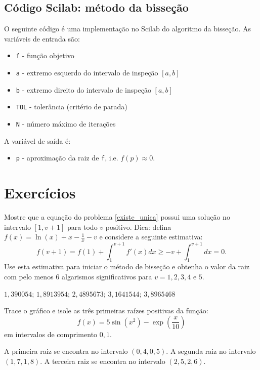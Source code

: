 \documentclass[main.tex]{subfiles}
\begin{document}
\ifisscilab
\subsection{Código Scilab: método da bisseção}

O seguinte código é uma implementação no Scilab do algoritmo da bisseção. As variáveis de entrada são:
\begin{itemize}
\item \verb+f+ - função objetivo
\item \verb+a+ - extremo esquerdo do intervalo de inspeção $[a, b]$
\item \verb+b+ - extremo direito do intervalo de inspeção $[a, b]$
\item \verb+TOL+ - tolerância (critério de parada)
\item \verb+N+ - número máximo de iterações
\end{itemize}
A variável de saída é:
\begin{itemize}
\item \verb+p+ - aproximação da raiz de \verb+f+, i.e. $f(p) \approx 0$.
\end{itemize}


\fi

\section*{Exercícios}

\begin{Exercise} Mostre que a equação do problema \ref{existe_unica} possui uma solução no intervalo $[1, v+1]$ para todo $v$ positivo. Dica: defina $f(x)=\ln(x)+x-\frac{1}{x}-v$  e considere a seguinte estimativa:
  \begin{equation*}
    f(v+1)=f(1)+\int_1^{v+1}f'(x)dx\geq -v+\int_1^{v+1}dx=0.  
  \end{equation*}
Use esta estimativa para iniciar o método de bisseção e obtenha o valor da raiz com pelo menos 6 algarismos significativos para $v=1, 2, 3, 4$ e $5$.
\end{Exercise}
\begin{Answer}
  \begin{tiny}
    $1,390054$; $1,8913954$; $2,4895673$; $3,1641544$; $3,8965468$    
  \end{tiny}
\end{Answer}

\begin{Exercise} Trace o gráfico e isole as três primeiras raízes positivas da função:
  \begin{equation*}
    f(x)=5\sin(x^2)-\exp\left({\frac{x}{10}}\right)  
  \end{equation*}
em intervalos de comprimento $0,1$.
\end{Exercise}
\begin{Answer}
  \begin{tiny}
    A primeira raiz se encontra no intervalo $(0,4, 0,5)$. A segunda raiz no intervalo $(1,7, 1,8)$. A terceira raiz se encontra no intervalo $(2,5, 2,6)$.    
  \end{tiny}
\end{Answer}
\end{document}
